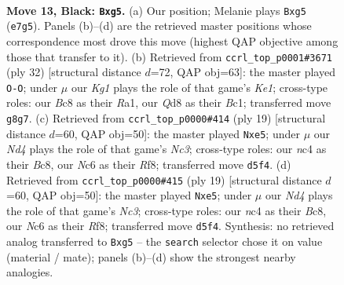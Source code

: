 \documentclass[11pt]{article}
\begin{document}
\clearpage

\begin{figure}[p]\centering
\begin{subfigure}{0.46\textwidth}\centering
\resizebox{\linewidth}{!}{%
\newchessgame
\chessboard[
  setfen={r1bqr1k1/1pp1bp1p/2n1p3/p2n2P1/2NP4/4PBP1/PP3P2/RNBQR1K1 b - - 0 13},
  showmover=false,
  pgfstyle=straightmove, color=movearrow, markmove={e7-g5}
]}
\caption{}
\end{subfigure}\hfill
\begin{subfigure}{0.46\textwidth}\centering
\resizebox{\linewidth}{!}{%
\newchessgame
\chessboard[
  setfen={r3kb1r/2q2ppp/p1n1pnb1/1p6/3P1N2/2N4P/PP2BPP1/R1BQK2R w KQkq - 3 17},
  showmover=false,
  pgfstyle=straightmove, color=movearrow, markmove={e1-g1}
]}
\caption{}
\end{subfigure}
\\[4pt]
\begin{subfigure}{0.46\textwidth}\centering
\resizebox{\linewidth}{!}{%
\newchessgame
\chessboard[
  setfen={r1bq1rk1/2p1bppp/p1n5/1p1nN3/8/1BP5/PP1P1PPP/RNBQR1K1 b - - 0 10},
  showmover=false,
  pgfstyle=straightmove, color=movearrow, markmove={c6-e5}
]}
\caption{}
\end{subfigure}\hfill
\begin{subfigure}{0.46\textwidth}\centering
\resizebox{\linewidth}{!}{%
\newchessgame
\chessboard[
  setfen={r1bq1rk1/2p1bppp/p1n5/1p1nN3/8/1BP5/PP1P1PPP/RNBQR1K1 b - - 0 10},
  showmover=false,
  pgfstyle=straightmove, color=movearrow, markmove={c6-e5}
]}
\caption{}
\end{subfigure}
\caption{\textbf{Move 13, Black: \texttt{Bxg5}.} (a) Our position; Melanie plays \texttt{Bxg5} (\texttt{e7g5}). Panels (b)--(d) are the retrieved master positions whose correspondence most drove this move (highest QAP objective among those that transfer to it). (b) Retrieved from \texttt{ccrl\_top\_p0001\#3671} (ply 32) [structural distance $d$=72, QAP obj=63]: the master played \texttt{O-O}; under $\mu$ our \emph{Kg1} plays the role of that game's \emph{Ke1}; cross-type roles: our \emph{B}c8 as their \emph{R}a1, our \emph{Q}d8 as their \emph{B}c1; transferred move \texttt{g8g7}. (c) Retrieved from \texttt{ccrl\_top\_p0000\#414} (ply 19) [structural distance $d$=60, QAP obj=50]: the master played \texttt{Nxe5}; under $\mu$ our \emph{Nd4} plays the role of that game's \emph{Nc3}; cross-type roles: our \emph{n}c4 as their \emph{B}c8, our \emph{N}c6 as their \emph{R}f8; transferred move \texttt{d5f4}. (d) Retrieved from \texttt{ccrl\_top\_p0000\#415} (ply 19) [structural distance $d$=60, QAP obj=50]: the master played \texttt{Nxe5}; under $\mu$ our \emph{Nd4} plays the role of that game's \emph{Nc3}; cross-type roles: our \emph{n}c4 as their \emph{B}c8, our \emph{N}c6 as their \emph{R}f8; transferred move \texttt{d5f4}. Synthesis: no retrieved analog transferred to \texttt{Bxg5} -- the \texttt{search} selector chose it on value (material / mate); panels (b)--(d) show the strongest nearby analogies.}
\label{fig:thought-m25}
\end{figure}
\end{document}
